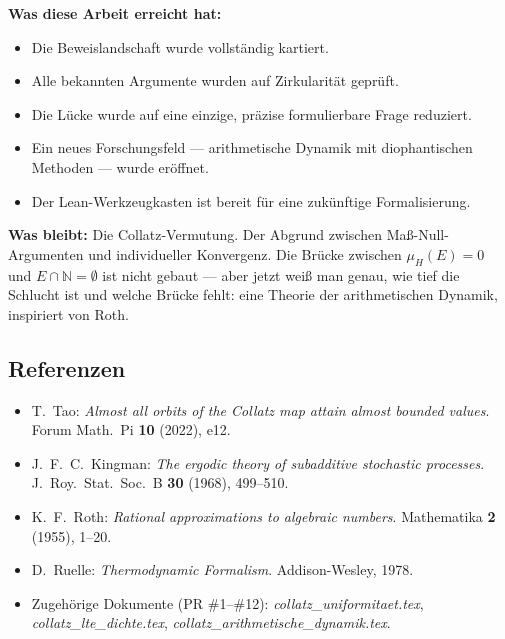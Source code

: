 \documentclass[12pt,a4paper]{article}
\newcommand{\N}{\mathbb{N}}
\begin{document}
\begin{tcolorbox}[adisch, title={Abschlussbilanz der Grenzbefestigung}]
\textbf{Was diese Arbeit erreicht hat:}
\begin{itemize}[nosep, itemsep=2pt]
  \item Die Beweislandschaft wurde vollständig kartiert.
  \item Alle bekannten Argumente wurden auf Zirkularität geprüft.
  \item Die Lücke wurde auf eine einzige, präzise formulierbare Frage
    reduziert.
  \item Ein neues Forschungsfeld --- arithmetische Dynamik mit
    diophantischen Methoden --- wurde eröffnet.
  \item Der Lean-Werkzeugkasten ist bereit für eine zukünftige
    Formalisierung.
\end{itemize}

\medskip
\textbf{Was bleibt:}
Die Collatz-Vermutung. Der Abgrund zwischen Maß-Null-Argumenten
und individueller Konvergenz. Die Brücke zwischen $\mu_H(E) = 0$
und $E \cap \N = \emptyset$ ist nicht gebaut --- aber jetzt weiß man
genau, wie tief die Schlucht ist und welche Brücke fehlt:
eine Theorie der arithmetischen Dynamik, inspiriert von Roth.
\end{tcolorbox}

\subsection*{Referenzen}

\begin{itemize}
  \item T.\ Tao: \textit{Almost all orbits of the Collatz map attain
    almost bounded values}. Forum Math.\ Pi \textbf{10} (2022), e12.
  \item J.\ F.\ C.\ Kingman: \textit{The ergodic theory of subadditive
    stochastic processes}. J.\ Roy.\ Stat.\ Soc.\ B \textbf{30} (1968), 499--510.
  \item K.\ F.\ Roth: \textit{Rational approximations to algebraic numbers}.
    Mathematika \textbf{2} (1955), 1--20.
  \item D.\ Ruelle: \textit{Thermodynamic Formalism}. Addison-Wesley, 1978.
  \item Zugehörige Dokumente (PR \#1--\#12):
    \textit{collatz\_uniformitaet.tex},
    \textit{collatz\_lte\_dichte.tex},
    \textit{collatz\_arithmetische\_dynamik.tex}.
\end{itemize}
\end{document}

